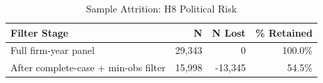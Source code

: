 \begin{table}[htbp]
\centering
\small
\caption{Sample Attrition: H8 Political Risk}
\label{tab:sample_attrition_h8_political_risk}
\begin{tabular}{lrrr}
\toprule
Filter Stage & N & N Lost & \% Retained \\
\midrule
Full firm-year panel & 29,343 & 0 & 100.0\% \\
After complete-case + min-obs filter & 15,998 & -13,345 & 54.5\% \\
\bottomrule
\end{tabular}
\end{table}